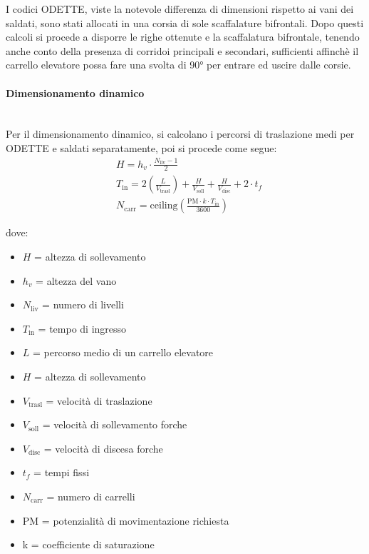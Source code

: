 \documentclass[11pt]{article}
\begin{document}
I codici ODETTE, viste la notevole differenza di dimensioni rispetto ai vani dei saldati, sono stati allocati in una corsia di sole scaffalature bifrontali.
Dopo questi calcoli si procede a disporre le righe ottenute e la scaffalatura bifrontale, tenendo anche conto della presenza di corridoi principali e secondari, sufficienti affinchè il carrello elevatore possa fare una svolta di 90° per entrare ed uscire dalle corsie.
\newpage

\paragraph{Dimensionamento dinamico}\mbox{}\\
Per il dimensionamento dinamico, si calcolano i percorsi di traslazione medi per ODETTE e saldati separatamente, poi si procede come segue:
\begin{align}
    & H = h_v \cdot \frac{N_\text{liv}-1}{2} \\
    & T_\text{in} = 2\left(\frac{L}{V_\text{trasl}}\right)+\frac{H}{V_\text{soll}}+\frac{H}{V_\text{disc}}+2\cdot t_f \\
    & N_\text{carr} = \text{ceiling}\left(\frac{\text{PM} \cdot k \cdot T_\text{in}}{3600}\right)
\end{align}

\noindent
dove:
\begin{itemize}
    \item $H$ = altezza di sollevamento
    \item $h_v$ = altezza del vano
    \item $N_\text{liv}$ = numero di livelli
    \item $T_\text{in}$ = tempo di ingresso
    \item $L$ = percorso medio di un carrello elevatore
    \item $H$ = altezza di sollevamento
    \item $V_\text{trasl}$ = velocità di traslazione
    \item $V_\text{soll}$ = velocità di sollevamento forche
    \item $V_\text{disc}$ = velocità di discesa forche
    \item $t_f$ = tempi fissi
    \item $N_\text{carr}$ = numero di carrelli
    \item PM = potenzialità di movimentazione richiesta
    \item k = coefficiente di saturazione
\end{itemize}
\end{document}
